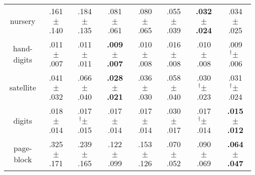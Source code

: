 \begin{tabular}{|c|ccccccc|}
nursery & .161$^{\phantom{\dag}}\pm^{\phantom{\dag}}$.140\cellcolor{red!27} & .184$^{\phantom{\dag}}\pm^{\phantom{\dag}}$.135\cellcolor{red!40} & .081$^{\phantom{\dag}}\pm^{\phantom{\dag}}$.061\cellcolor{green!14} & .080$^{\phantom{\dag}}\pm^{\phantom{\dag}}$.065\cellcolor{green!14} & .055$^{\phantom{\dag}}\pm^{\phantom{\dag}}$.039\cellcolor{green!27} & \textbf{.032$^{\phantom{\dag}}\pm^{\phantom{\dag}}$.024}\cellcolor{green!40} & .034$^{\phantom{\dag}}\pm^{\phantom{\dag}}$.025\cellcolor{green!38} \\
hand-digits & .011$^{\phantom{\dag}}\pm^{\phantom{\dag}}$.007\cellcolor{green!17} & .011$^{\phantom{\dag}}\pm^{\phantom{\dag}}$.011\cellcolor{green!10} & \textbf{.009$^{\phantom{\dag}}\pm^{\phantom{\dag}}$.007}\cellcolor{green!40} & .010$^{\phantom{\dag}}\pm^{\phantom{\dag}}$.008\cellcolor{green!23} & .016$^{\phantom{\dag}}\pm^{\phantom{\dag}}$.008\cellcolor{red!40} & .010$^{\phantom{\dag}}\pm^{\phantom{\dag}}$.008\cellcolor{green!25} & .009$^{\dag}\pm^{\phantom{\dag}}$.006\cellcolor{green!36} \\
satellite & .041$^{\phantom{\dag}}\pm^{\phantom{\dag}}$.032\cellcolor{green!12} & .066$^{\phantom{\dag}}\pm^{\phantom{\dag}}$.040\cellcolor{red!40} & \textbf{.028$^{\phantom{\dag}}\pm^{\phantom{\dag}}$.021}\cellcolor{green!40} & .036$^{\phantom{\dag}}\pm^{\phantom{\dag}}$.030\cellcolor{green!23} & .058$^{\phantom{\dag}}\pm^{\phantom{\dag}}$.040\cellcolor{red!23} & .030$^{\dag}\pm^{\phantom{\dag}}$.023\cellcolor{green!36} & .031$^{\dag}\pm^{\phantom{\dag}}$.024\cellcolor{green!33} \\
digits & .018$^{\phantom{\dag}}\pm^{\phantom{\dag}}$.014\cellcolor{green!26} & .017$^{\dag}\pm^{\phantom{\dag}}$.015\cellcolor{green!31} & .017$^{\phantom{\dag}}\pm^{\phantom{\dag}}$.014\cellcolor{green!30} & .017$^{\phantom{\dag}}\pm^{\phantom{\dag}}$.014\cellcolor{green!32} & .030$^{\phantom{\dag}}\pm^{\phantom{\dag}}$.017\cellcolor{red!40} & .017$^{\dag}\pm^{\phantom{\dag}}$.014\cellcolor{green!33} & \textbf{.015$^{\phantom{\dag}}\pm^{\phantom{\dag}}$.012}\cellcolor{green!40} \\
page-block & .325$^{\phantom{\dag}}\pm^{\phantom{\dag}}$.171\cellcolor{red!40} & .239$^{\phantom{\dag}}\pm^{\phantom{\dag}}$.165\cellcolor{red!13} & .122$^{\phantom{\dag}}\pm^{\phantom{\dag}}$.099\cellcolor{green!22} & .153$^{\phantom{\dag}}\pm^{\phantom{\dag}}$.126\cellcolor{green!12} & .070$^{\phantom{\dag}}\pm^{\phantom{\dag}}$.052\cellcolor{green!38} & .090$^{\phantom{\dag}}\pm^{\phantom{\dag}}$.069\cellcolor{green!32} & \textbf{.064$^{\phantom{\dag}}\pm^{\phantom{\dag}}$.047}\cellcolor{green!40} \\

\end{tabular}
